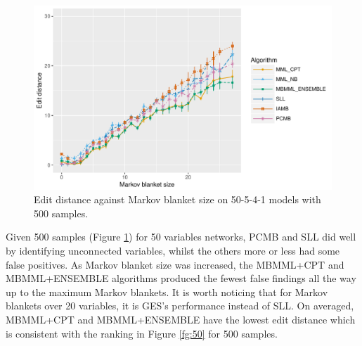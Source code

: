 \begin{figure}[H]
  \centering
    \includegraphics[scale=0.6]{figures/ed_vs_mbsize_50_5_4_1_500.pdf}
  \caption{Edit distance against Markov blanket size on 50-5-4-1 models with 500 samples.}
  \label{fg:ed_mb_50_500}
\end{figure} 
Given 500 samples (Figure \ref{fg:ed_mb_50_500}) for 50 variables networks, PCMB and SLL did well by identifying unconnected variables, whilst the others more or less had some false positives. As Markov blanket size was increased, the MBMML+CPT and MBMML+ENSEMBLE algorithms produced the fewest false findings all the way up to the maximum Markov blankets. It is worth noticing that for Markov blankets over 20 variables, it is GES's performance instead of SLL. On averaged, MBMML+CPT and MBMML+ENSEMBLE have the lowest edit distance which is consistent with the ranking in Figure \ref{fg:50} for 500 samples. 

